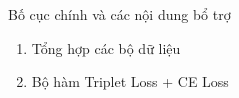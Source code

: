 \begin{frame}{Bố cục chính và các nội dung bổ trợ}
	\begin{enumerate}
		\item Tổng hợp các bộ dữ liệu
		\item Bộ hàm Triplet Loss + CE Loss
	\end{enumerate}
\end{frame}